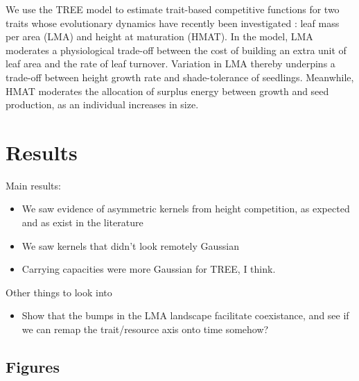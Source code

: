 \documentclass[a4paper,11pt]{article}
\begin{document}
We use the TREE model to estimate trait-based competitive functions for
two traits whose evolutionary dynamics have recently been investigated
\citep{Falster-2015}: leaf mass per area (LMA) and height at maturation
(HMAT). In the model, LMA moderates a physiological trade-off between the cost
of building an extra unit of leaf area and the rate of leaf turnover.
Variation in LMA thereby underpins a trade-off between height growth rate and
shade-tolerance of seedlings. Meanwhile, HMAT moderates the allocation of
surplus energy between growth and seed production, as an individual increases in
size.

\clearpage

\section{Results}

Main results:

\begin{itemize}
\item We saw evidence of asymmetric kernels from height competition,
  as expected and as exist in the literature
\item We saw kernels that didn't look remotely Gaussian
\item Carrying capacities were more Gaussian for TREE, I think.
\end{itemize}

Other things to look into

\begin{itemize}
\item Show that the bumps in the LMA landscape facilitate coexistance,
  and see if we can remap the trait/resource axis onto time somehow?
\end{itemize}

\subsection{Figures}
\end{document}
